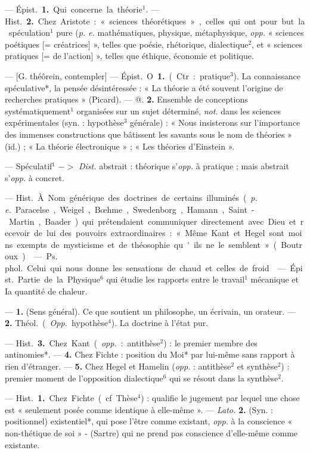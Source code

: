 \begin{itemize}[leftmargin=1cm, label=, itemsep=1pt]
 — \si{Épist.} {\bf 1.} Qui concerne
la théorie$^1$. — \si{Hist.} {\bf 2.} Chez Aristote :
« sciences théorétiques », celles qui
ont pour but la spéculation$^1$ pure
({\it p. e.} mathématiques, physique, métaphysique, {\it opp.} « sciences poétiques [= créatrices] », telles que
poésie, rhétorique, dialectique$^2$, et
« sciences pratiques [= de l'action] »,
telles que éthique, économie et politique.

 — [G. théôrein, contempler] —
\si{Épist.} O. {\bf 1.} (Ctr. : pratique$^3$). La
connaissance spéculative*, la pensée
désintéressée : « La théorie a été
souvent l’origine de recherches pratiques » (Picard). — @. {\bf 2.} Ensemble
de conceptions systématiquement$^1$
organisées sur un sujet déterminé,
{\it not.} dans les sciences expérimentales
(syn. : hypothèse$^3$ générale) : « Nous
insisterons sur l'importance des
immenses constructions que bâtissent les savants sous le nom de
théories » (id.) ; « La théorie électronique » ; « Les théories d’Einstein ».

 — Spéculatif$^1$ $->$ {\it Dist.}
abstrait : théorique s’{\it opp.} à pratique ; mais abstrait s'{\it opp.} à concret.

 — \si{Hist.} À. Nom générique
des doctrines de certains illuminés
({\it p. e.} Paracelse, Weigel, Bœhme,
Swedenborg, Hamann, Saint-Martin,
Baader) qui prétendaient communiquer directement avec Dieu et
recevoir de lui des pouvoirs extraordinaires :
« Même Kant et Hegel
sont moins exempts de mysticisme
et de théosophie qu'ils ne le semblent » (Boutroux).

 — \si{Ps. phol.} Celui
qui nous donne les sensations de
chaud et celles de froid.

 — \si{Épist.} Partie
de la Physique$^6$ qui étudie les rapports
entre le travail$^1$ mécanique et Ia
quantité de chaleur.

 — {\bf 1.} (Sens général). Ce que
soutient un philosophe, un écrivain,
un orateur. — {\bf 2.} \si{Théol.} ({\it Opp.}
hypothèse$^4$). La doctrine à l'état pur.

— \si{Hist.} {\bf 3.} Chez Kant ({\it opp.} : antithèse$^2$) : le premier membre des antinomies*. — {\bf 4.} Chez Fichte : position du Moi* par lui-même sans
rapport à rien d’étranger. — {\bf 5.} Chez
Hegel et Hamelin ({\it opp.} : antithèse$^2$
et synthèse$^2$) : premier moment de
l'opposition dialectique$^6$ qui se résout dans la synthèse$^2$.

 — \si{Hist.} {\bf 1.} Chez Fichte (cf.
Thèse$^4$) : qualifie le jugement par
lequel une chose est « seulement
posée comme identique à elle-même ». — {\it Lato.} {\bf 2.} (Syn. : positionnel) existentiel*, qui pose
l'être comme existant, {\it opp.} à la
conscience « non-thétique de soi »
- (Sartre) qui ne prend pas conscience
d’elle-même comme existante.


\end{itemize}
